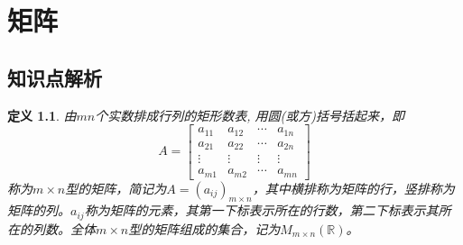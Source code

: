 \documentclass[a4paper]{book}
\newtheorem{Def}{定义}[chapter]
\begin{document}

\chapter{矩阵}

\section{知识点解析}

\begin{Def}
由$mn$个实数排成行列的矩形数表, 用圆(或方)括号括起来，即
$$A = \begin{bmatrix}
a_{11} & a_{12} & \cdots & a_{1n} \\ a_{21} & a_{22} & \cdots & a_{2n} \\ \vdots & \vdots & \vdots & \vdots \\ a_{m1} & a_{m2} & \cdots & a_{mn}
\end{bmatrix}$$
称为$m\times n$型的矩阵，简记为$A = (a_{ij})_{m\times n}$，其中横排称为矩阵的行，竖排称为矩阵的列。$a_{ij}$称为矩阵的元素，其第一下标表示所在的行数，第二下标表示其所在的列数。全体$m\times n$型的矩阵组成的集合，记为$M_{m\times n}(\mathbb{R})$。
\end{Def}
\end{document}
